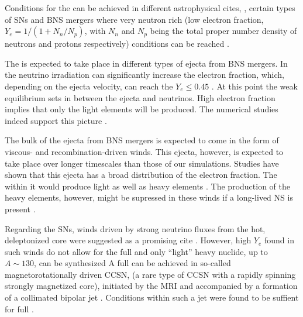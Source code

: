 Conditions for the \rproc{} can be achieved in different astrophysical cites, \eg, 
certain types of \acp{SN} and \ac{BNS} mergers where very neutron rich (low 
electron fraction, $Y_e = 1/(1 + N_n/N_p)$, with $N_n$ and $N_p$ being the 
total proper number density of neutrons and protons respectively) 
conditions can be reached
\citep{Mathews:1990,Thielemann:2011,Lippuner:2015gwa,Siegel:2019mlp}. 

The \rproc{} is expected to take place in different types of ejecta from \ac{BNS} mergers.
In \nwind{} the neutrino irradiation can significantly increase the electron 
fraction, which, depending on the ejecta velocity, can reach the 
$Y_e\leq 0.45$ \citep{Qian:1996xt}. 
%
At this point the weak equilibrium sets in between the ejecta and neutrinos.
High electron fraction implies that only the light elements will be produced.
The numerical studies indeed support this picture 
\citep{Dessart:2008zd,Perego:2014fma,Just:2014fka,Martin:2015hxa,Foucart:2016rxm}. 

The bulk of the ejecta from \ac{BNS} mergers is expected to come in the form of 
viscous- and recombination-driven winds. This ejecta, however, is expected to take 
place over longer timescales than those of our simulations.
Studies have shown that this ejecta has a broad distribution of the electron fraction.
The \rproc{} \nuc{} within it would produce light as well as heavy elements
\citep{Fernandez:2013tya,Just:2014fka,Wu:2016pnw,Siegel:2017nub,Fujibayashi:2017puw,Fernandez:2018kax}.
The production of the heavy \rproc{} elements, however, might be supressed in these winds
if a long-lived \ac{NS} is present \citep{Metzger:2014ila,Lippuner:2017bfm}.

Regarding the \acp{SN}, winds driven by strong neutrino fluxes from the hot, deleptonized
core \citep{Qian:1996xt} were suggested as a promising cite \citep{Woosley:2002,Wanajo:2006mq}.
However, high $Y_e$ found in such winds do not allow for the full \rproc{} and only ``light'' heavy 
nuclide, up to $A\sim130$, can be synthesized 
\citep{Qian:1996xt,Thompson:2001ys,Fischer:2010,Roberts:2010,MartinezPinedo:2012rb,Wanajo:2013} 
%
A full \rproc{} can be achieved in so-called magnetorotationally driven \ac{CCSN},
(a rare type of \ac{CCSN} with a rapidly spinning strongly magnetized core), 
initiated by the \ac{MRI} and accompanied by a %
formation of a 
collimated bipolar jet 
\citep{Wheeler:2000,Akiyama:2003,Burrows:2007yx,Mosta:2014jaa,Mosta:2015,Siegel:2019mlp}.
Conditions within such a jet were found to be suffient for full \rproc{} \nuc{} 
\citep{Winteler:2012,Nishimura:2015nca}.

